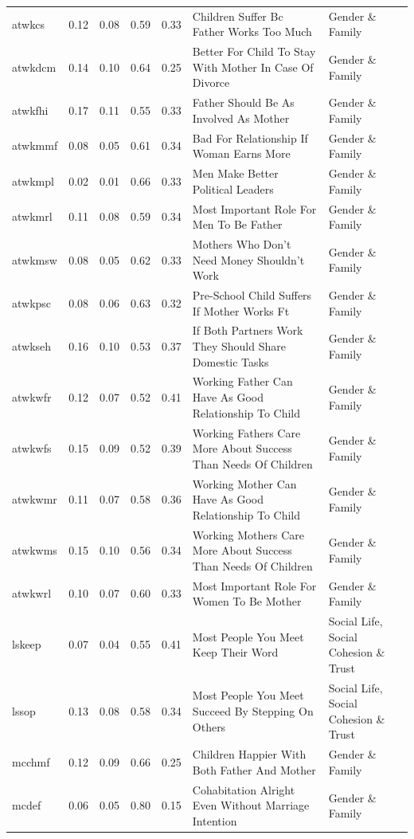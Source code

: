 \documentclass[
  12pt,
]{article}
\begin{document}
\begin{landscape}
\begin{scriptsize}
\begin{longtable}{|p{1.75in}|p{0.3in}|p{0.3in}|p{0.3in}|p{0.3in}|p{2.5in}|p{2.5in}}
atwkcs & 0.12 & 0.08 & 0.59 & 0.33 & Children Suffer Bc Father Works Too Much & Gender \& Family \\ 
atwkdcm & 0.14 & 0.10 & 0.64 & 0.25 & Better For Child To Stay With Mother In Case Of Divorce & Gender \& Family \\ 
atwkfhi & 0.17 & 0.11 & 0.55 & 0.33 & Father Should Be As Involved As Mother & Gender \& Family \\ 
atwkmmf & 0.08 & 0.05 & 0.61 & 0.34 & Bad For Relationship If Woman Earns More & Gender \& Family \\ 
atwkmpl & 0.02 & 0.01 & 0.66 & 0.33 & Men Make Better Political Leaders & Gender \& Family \\ 
atwkmrl & 0.11 & 0.08 & 0.59 & 0.34 & Most Important Role For Men To Be Father & Gender \& Family \\ 
atwkmsw & 0.08 & 0.05 & 0.62 & 0.33 & Mothers Who Don't Need Money Shouldn't Work & Gender \& Family \\ 
atwkpsc & 0.08 & 0.06 & 0.63 & 0.32 & Pre-School Child Suffers If Mother Works Ft & Gender \& Family \\ 
atwkseh & 0.16 & 0.10 & 0.53 & 0.37 & If Both Partners Work They Should Share Domestic Tasks & Gender \& Family \\ 
atwkwfr & 0.12 & 0.07 & 0.52 & 0.41 & Working Father Can Have As Good Relationship To Child & Gender \& Family \\ 
atwkwfs & 0.15 & 0.09 & 0.52 & 0.39 & Working Fathers Care More About Success Than Needs Of Children & Gender \& Family \\ 
atwkwmr & 0.11 & 0.07 & 0.58 & 0.36 & Working Mother Can Have As Good Relationship To Child & Gender \& Family \\ 
atwkwms & 0.15 & 0.10 & 0.56 & 0.34 & Working Mothers Care More About Success Than Needs Of Children & Gender \& Family \\ 
atwkwrl & 0.10 & 0.07 & 0.60 & 0.33 & Most Important Role For Women To Be Mother & Gender \& Family \\ 
lskeep & 0.07 & 0.04 & 0.55 & 0.41 & Most People You Meet Keep Their Word & Social Life, Social Cohesion \& Trust \\ 
lssop & 0.13 & 0.08 & 0.58 & 0.34 & Most People You Meet Succeed By Stepping On Others & Social Life, Social Cohesion \& Trust \\ 
mcchmf & 0.12 & 0.09 & 0.66 & 0.25 & Children Happier With Both Father And Mother & Gender \& Family \\ 
mcdef & 0.06 & 0.05 & 0.80 & 0.15 & Cohabitation Alright Even Without Marriage Intention & Gender \& Family \\ 

\end{longtable}
\end{scriptsize}
\end{landscape}
\end{document}
